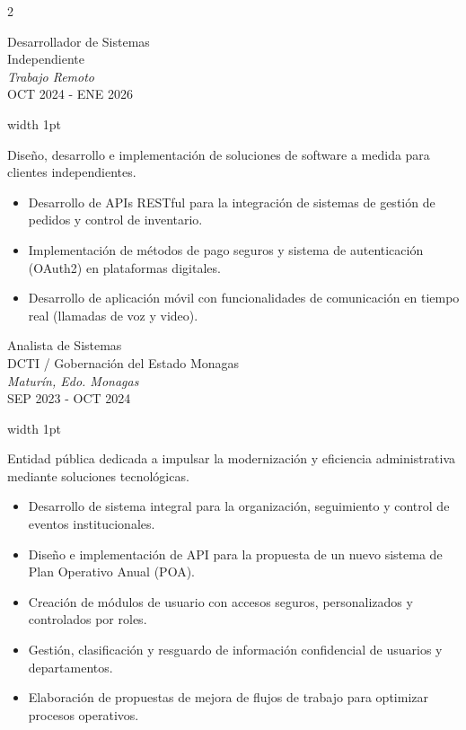 \documentclass[9pt, a4paper]{article}
\newcommand{\CVExpMeta}[4]{
    {\noindent
    {\PlexMedium\color{CVPrimary} #1} \\
    {\PlexSans #2} \\
    {\PlexLight\itshape #3} \\
    {\PlexExtraLight #4}}
    \vspace{0.85cm}
}
\newcommand{\CVExpBody}[1]{
    \noindent
    \textcolor{CVLine}{\vrule width 1pt} \hspace{1cm}
    \begin{minipage}[t]{0.92\linewidth}
        \raggedright {\DMSansLight #1}
    \end{minipage}
    \vspace{0.8cm}
}
\begin{document}
\setlength{\columnsep}{1.6cm}
\begin{paracol}{2}

\CVExpMeta{Desarrollador de Sistemas}
{Independiente}
{Trabajo Remoto}
{OCT 2024 - ENE 2026}
\switchcolumn
\CVExpBody{
Diseño, desarrollo e implementación de soluciones de software a medida para clientes independientes.
\begin{itemize}[label=\textcolor{CVBullet}{–}, leftmargin=0.5cm, topsep=0.4cm, itemsep=0.15cm]
    \item Desarrollo de APIs RESTful para la integración de sistemas de gestión de pedidos y control de inventario.
    \item Implementación de métodos de pago seguros y sistema de autenticación (OAuth2) en plataformas digitales.
    \item Desarrollo de aplicación móvil con funcionalidades de comunicación en tiempo real (llamadas de voz y video).
\end{itemize}
}
\switchcolumn*

\CVExpMeta{Analista de Sistemas}
{DCTI / Gobernación del Estado Monagas}
{Maturín, Edo. Monagas}
{SEP 2023 - OCT 2024}
\switchcolumn
\CVExpBody{
Entidad pública dedicada a impulsar la modernización y eficiencia administrativa mediante soluciones tecnológicas.
\begin{itemize}[label=\textcolor{CVBullet}{–}, leftmargin=0.5cm, topsep=0.4cm, itemsep=0.15cm]
    \item Desarrollo de sistema integral para la organización, seguimiento y control de eventos institucionales.
    \item Diseño e implementación de API para la propuesta de un nuevo sistema de Plan Operativo Anual (POA).
    \item Creación de módulos de usuario con accesos seguros, personalizados y controlados por roles.
    \item Gestión, clasificación y resguardo de información confidencial de usuarios y departamentos.
    \item Elaboración de propuestas de mejora de flujos de trabajo para optimizar procesos operativos.
\end{itemize}
}
\switchcolumn*


\end{paracol}
\end{document}

